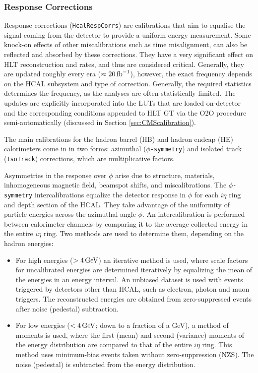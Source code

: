\subsubsection{Response Corrections}
Response corrections (\texttt{HcalRespCorrs}) \cite{CMS-PRF-18-001} are calibrations that aim to equalise the signal coming from the detector to provide a uniform energy measurement. Some knock-on effects of other miscalibrations such as time misalignment, can also be reflected and absorbed by these corrections. They have a very significant effect on HLT reconstruction and rates, and thus are considered critical. Generally, they are updated roughly every era ($\approx 20 \mbox{\ensuremath{\,\text{fb}^{-1}}}$), however, the exact frequency depends on the HCAL subsystem and type of correction. Generally, the required statistics determines the frequency, as the analyses are often statistically-limited. The updates are explicitly incorporated into the LUTs that are loaded on-detector and the corresponding conditions appended to HLT GT via the O2O procedure semi-automatically (discussed in Section \ref{sec:CMScalibration}).

The main calibrations for the hadron barrel (HB) and hadron endcap (HE) calorimeters come in in two forms: azimuthal ($\phi$\texttt{-symmetry}) and isolated track (\texttt{IsoTrack}) corrections, which are multiplicative factors. 

Asymmetries in the response over $\phi$ arise due to structure, materials, inhomogeneous magnetic field, beamspot shifts, and miscalibrations. The $\phi$\texttt{-symmetry} intercalibrations equalize the detector response in $\phi$ for each $i\eta$ ring and depth section of the HCAL. They take advantage of the uniformity of particle energies across the azimuthal angle $\phi$. An intercalibration is performed between calorimeter channels by comparing it to the average collected energy in the entire $i\eta$ ring. Two methods are used to determine them, depending on the hadron energies:
\begin{itemize}
    \item For high energies ($> 4 \,\text{Ge\hspace{-.08em}V}$) an iterative method is used, where scale factors for uncalibrated energies are determined iteratively by equalizing the mean of the energies in an energy interval. An unbiased dataset is used with events triggered by detectors other than HCAL, such as electron, photon and muon triggers. The reconstructed energies are obtained from zero-suppressed events after noise (pedestal) subtraction.
    \item For low energies ($< 4 \,\text{Ge\hspace{-.08em}V}$; down to a fraction of a GeV), a method of moments is used, where the first (mean) and second (variance) moments of the energy distribution are compared to that of the entire $i\eta$ ring. This method uses minimum-bias events taken without zero-suppression (NZS). The noise (pedestal) is subtracted from the energy distribution.
\end{itemize}

